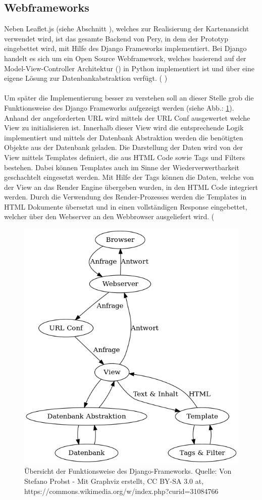 \documentclass[Bachelorarbeit.tex]{subfiles}
\begin{document}
\subsection*{Webframeworks}
Neben Leaflet.js (siehe Abschnitt ), welches zur Realisierung der Kartenansicht verwendet wird, ist das gesamte Backend von Pery, in dem der Prototyp eingebettet wird, mit Hilfe des Django Frameworks implementiert. 
Bei Django handelt es sich um ein Open Source Webframework, welches basierend auf der Model-View-Controller Architektur (\cite[vgl.][]{DjangoMVC}) in Python implementiert ist und über eine eigene Lösung zur Datenbankabstraktion verfügt. (\cite[vgl.][]{DjangoDoc} \cite[sowie][- sekundär Quelle]{DjangoStackoverflow})\\
\\
Um später die Implementierung besser zu verstehen soll an dieser Stelle grob die Funktionsweise des Django Frameworks aufgezeigt werden (siehe Abb.: \ref{fig:MTV_Django}).
Anhand der angeforderten \ac{URL} wird mittels der \ac{URL Conf} ausgewertet welche View zu initialisieren ist.
Innerhalb dieser View wird die entsprechende Logik implementiert und mittels
der Datenbank Abstraktion werden die benötigten Objekte aus der Datenbank geladen.
Die Darstellung der Daten wird von der View mittels Templates definiert, die  aus \ac{HTML} Code sowie Tags und Filters bestehen. 
Dabei können Templates auch im Sinne der Wiederverwertbarkeit geschachtelt eingesetzt werden. 
Mit Hilfe der Tags können die Daten, welche von der View an das Render Engine übergeben wurden, in den \ac{HTML} Code integriert werden.
Durch die Verwendung des Render-Prozesses werden die Templates in \ac{HTML} Dokumente übersetzt und in einen vollständigen Response eingebettet, welcher über den Webserver an den Webbrowser ausgeliefert wird. (\cite[vgl.][]{DjangoDoc}

\begin{figure}[H]
\centering
\includegraphics[width=0.7\linewidth]{img/Implementierung/MTV_Django}
\caption[k]{Übersicht der Funktionsweise des Django-Frameworks. Quelle: Von Stefano Probst - Mit Graphviz erstellt, CC BY-SA 3.0 at, https://commons.wikimedia.org/w/index.php?curid=31084766}
\label{fig:MTV_Django}
\end{figure}
\end{document}

